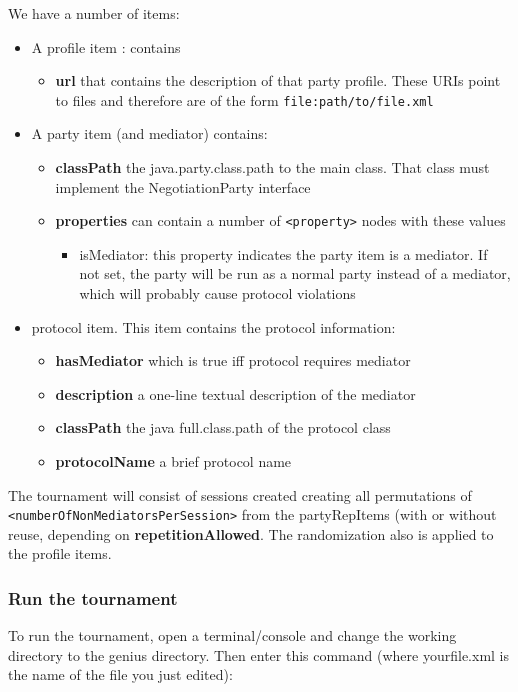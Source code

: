\documentclass[]{article}
\begin{document}
We have a number of items:
\begin{itemize}

\item A profile item : contains 
	 \begin{itemize}
	\item \textbf{url} that contains the description of that party profile. These URIs point to files and therefore are of the form \verb|file:path/to/file.xml|
  	\end{itemize}

\item A party item  (and mediator) contains:
  \begin{itemize}
    \item \textbf{classPath} the java.party.class.path to the main class. That class must implement the NegotiationParty interface
    \item \textbf{properties} can contain a number of \verb|<property>| nodes with these values
    		\begin{itemize}
		\item isMediator: this property indicates the party item is a mediator. If not set, the party will be 
		run as a normal party instead of a mediator, which will probably cause protocol violations
		\end{itemize}
  \end{itemize}

\item protocol item. This item contains the protocol information: 
	\begin{itemize}
	\item \textbf{hasMediator} which is true iff protocol requires mediator
	\item \textbf{description} a one-line textual description of the mediator
	\item \textbf{classPath} the java full.class.path of the protocol class
	\item \textbf{protocolName} a brief protocol name 
	\end{itemize}
\end{itemize}



The tournament will consist of sessions created creating all permutations of \verb|<numberOfNonMediatorsPerSession>| from the partyRepItems (with or without reuse, depending on \textbf{repetitionAllowed}. The randomization also is applied to the profile items.


\subsubsection{Run the tournament}
To run the tournament, open a terminal/console and change the working directory to the genius directory.
Then enter this command (where yourfile.xml is the name of the file you just edited):
\end{document}
